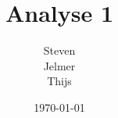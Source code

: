 \documentclass{article}
\title{Analyse 1}
\author{Steven\\Jelmer\\Thijs}
\date{\today}
\begin{document}
\maketitle
\begin{multicols}{2}





\end{multicols}
\end{document}
